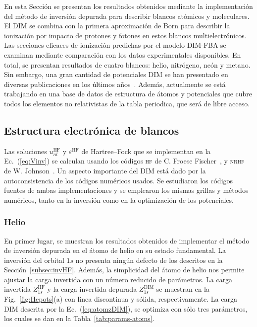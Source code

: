En esta Sección se presentan los resultados obtenidos mediante la  
implementación del método de inversión depurada para describir blancos
atómicos y moleculares. El DIM se combina con la primera aproximación de 
Born para describir la ionización por impacto de protones y fotones en 
estos blancos multielectrónicos. Las secciones eficaces de ionización 
predichas por el modelo DIM-FBA se examinan mediante comparación con los 
datos experimentales disponibles. En total, se presentan 
resultados de cuatro blancos: helio, nitrógeno, neón y metano. Sin 
embargo, una gran cantidad de potenciales DIM se han presentado en 
diversas publicaciones en los últimos años~\cite{Mendez:16,Mendez:19dim,
Mendez:18}. Además, actualmente se está trabajando en una base de datos 
de estructura de átomos y potenciales que cubre todos los elementos no 
relativistas de la tabla periodica, que será de libre acceso.

\subsection{Estructura electrónica de blancos}
\label{subsec:dimtarget}

Las soluciones $u_{nl}^{\mathrm{HF}}$ y $\varepsilon^{\mathrm{HF}}$ de 
Hartree--Fock que se implementan en la Ec.~(\ref{eq:Vinv}) se calculan 
usando los códigos \textsc{hf} de C. Froese 
Fischer~\cite{FroeseFischer:97}, 
y \textsc{nrhf} de W. Johnson~\cite{Johnson:07}. Un aspecto importante 
del DIM está dado por la autoconsistencia de los códigos numéricos 
usados. Se estudiaron los códigos fuentes de ambas implementaciones y se 
emplearon los mismas grillas y métodos numéricos, tanto en la inversión 
como en la optimización de los potenciales.

\subsubsection*{Helio}

En primer lugar, se muestran los resultados obtenidos de implementar
el método de inversión depurada en el átomo de helio en su estado
fundamental. La inversión del orbital $1s$ no presenta ningún defecto
de los descritos en la Sección~\ref{subsec:invHF}. Además, la 
simplicidad del átomo de helio nos permite ajustar la carga invertida 
con un número reducido de parámetros. La carga invertida 
$Z_{1s}^{\mathrm{HF}}$ y la carga invertida depurada 
$Z_{1s}^{\mathrm{DIM}}$ se muestran en la Fig.~\ref{fig:Hepots}(a) con 
línea discontinua y sólida, respectivamente. La carga DIM descrita por 
la Ec.~(\ref{eq:atomzDIM}), se optimiza con sólo tres parámetros, los 
cuales se dan en la Tabla~\ref{tab:params-atoms}. 

